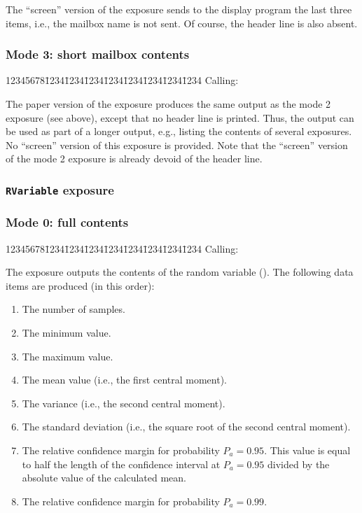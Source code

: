 The ``screen'' version of the exposure sends to the display program the last
three items, i.e., the mailbox name is not sent.
Of course, the header line is also absent.

\subsubsection*{Mode 3: short mailbox contents}

{\tt\begin{tabbing}
12345678\=1234\=1234\=1234\=1234\=1234\=1234\=1234\=1234\kill
{\rm Calling:}
\end{tabbing}}

The paper version of the exposure produces the same output as the mode 2
exposure (see above), except that no header line is printed.
Thus, the output can be used as part of a longer output, e.g., listing the
contents of several exposures.
No ``screen'' version of this exposure is provided.
Note that the ``screen'' version of the mode 2 exposure is already devoid of
the header line.

\subsubsection{{\tt RVariable} exposure}
\label{rm_ex_se_rv}

\subsubsection*{Mode 0: full contents}

{\tt\begin{tabbing}
12345678\=1234\=1234\=1234\=1234\=1234\=1234\=1234\=1234\kill
{\rm Calling:}
\end{tabbing}}

The exposure outputs the contents of the random variable ().
The following data items are produced (in this order):

\begin{enumerate}
\item
The number of samples.
\item
The minimum value.
\item
The maximum value.
\item
The mean value (i.e., the first central moment).
\item
The variance (i.e., the second central moment).
\item
The standard deviation (i.e., the square root of the second central moment).
\item
The relative confidence margin for probability $P_a=0.95$.
This value is equal to half the length of the confidence interval at
$P_a=0.95$ divided by the absolute value of the calculated mean.
\item
The relative confidence margin for probability $P_a=0.99$.
\end{enumerate}

